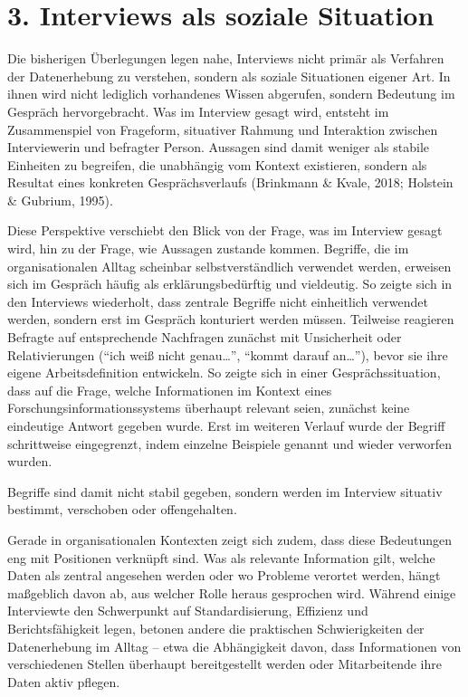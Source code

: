 \documentclass[a4paper,
fontsize=11pt,
oneside,
numbers=noperiodatend,
parskip=half-,
bibliography=totoc,
final
]{scrartcl}
\begin{document}
\section{3. Interviews als soziale
Situation}\label{interviews-als-soziale-situation}

Die bisherigen Überlegungen legen nahe, Interviews nicht primär als
Verfahren der Datenerhebung zu verstehen, sondern als soziale
Situationen eigener Art. In ihnen wird nicht lediglich vorhandenes
Wissen abgerufen, sondern Bedeutung im Gespräch hervorgebracht. Was im
Interview gesagt wird, entsteht im Zusammenspiel von Frageform,
situativer Rahmung und Interaktion zwischen Interviewerin und befragter
Person. Aussagen sind damit weniger als stabile Einheiten zu begreifen,
die unabhängig vom Kontext existieren, sondern als Resultat eines
konkreten Gesprächsverlaufs (Brinkmann \& Kvale, 2018; Holstein \&
Gubrium, 1995).

Diese Perspektive verschiebt den Blick von der Frage, was im Interview
gesagt wird, hin zu der Frage, wie Aussagen zustande kommen. Begriffe,
die im organisationalen Alltag scheinbar selbstverständlich verwendet
werden, erweisen sich im Gespräch häufig als erklärungsbedürftig und
vieldeutig. So zeigte sich in den Interviews wiederholt, dass zentrale
Begriffe nicht einheitlich verwendet werden, sondern erst im Gespräch
konturiert werden müssen. Teilweise reagieren Befragte auf entsprechende
Nachfragen zunächst mit Unsicherheit oder Relativierungen (\enquote{ich
weiß nicht genau\ldots{}}, \enquote{kommt darauf an\ldots{}}), bevor sie
ihre eigene Arbeitsdefinition entwickeln. So zeigte sich in einer
Gesprächssituation, dass auf die Frage, welche Informationen im Kontext
eines Forschungsinformationssystems überhaupt relevant seien, zunächst
keine eindeutige Antwort gegeben wurde. Erst im weiteren Verlauf wurde
der Begriff schrittweise eingegrenzt, indem einzelne Beispiele genannt
und wieder verworfen wurden.

Begriffe sind damit nicht stabil gegeben, sondern werden im Interview
situativ bestimmt, verschoben oder offengehalten.

Gerade in organisationalen Kontexten zeigt sich zudem, dass diese
Bedeutungen eng mit Positionen verknüpft sind. Was als relevante
Information gilt, welche Daten als zentral angesehen werden oder wo
Probleme verortet werden, hängt maßgeblich davon ab, aus welcher Rolle
heraus gesprochen wird. Während einige Interviewte den Schwerpunkt auf
Standardisierung, Effizienz und Berichtsfähigkeit legen, betonen andere
die praktischen Schwierigkeiten der Datenerhebung im Alltag -- etwa die
Abhängigkeit davon, dass Informationen von verschiedenen Stellen
überhaupt bereitgestellt werden oder Mitarbeitende ihre Daten aktiv
pflegen.
\end{document}
